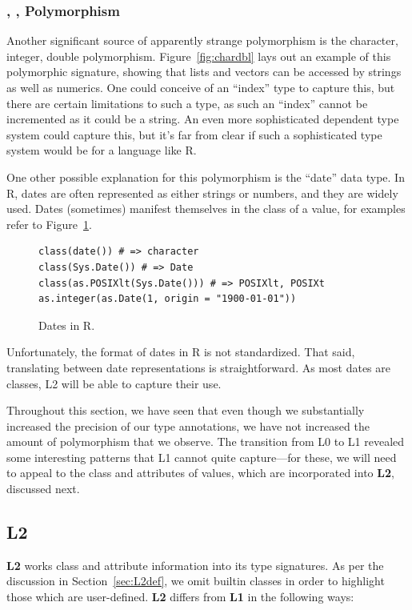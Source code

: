 \documentclass[acmsmall,10pt,review,anonymous]{acmart}\settopmatter{printfolios=true,printccs=false,printacmref=false}
\begin{document}
%
%
\subsubsection{\C, \I, \D Polymorphism}
Another significant source of apparently strange polymorphism is the character, integer, double polymorphism.
Figure~\ref{fig:chardbl} lays out an example of this polymorphic signature, showing that lists and vectors can be accessed by strings as well as numerics.
One could conceive of an ``index'' type to capture this, but there are certain limitations to such a type, as such an ``index'' cannot be incremented as it could be a string.
An even more sophisticated dependent type system could capture this, but it's far from clear if such a sophisticated type system would be for a language like R.

One other possible explanation for this polymorphism is the ``date'' data type.
In R, dates are often represented as either strings or numbers, and they are widely used.
Dates (sometimes) manifest themselves in the class of a value, for examples refer to Figure~\ref{fig:date}.
\begin{figure}[!hb]{\small\begin{lstlisting}[style=R]
class(date()) # => character
class(Sys.Date()) # => Date
class(as.POSIXlt(Sys.Date())) # => POSIXlt, POSIXt
as.integer(as.Date(1, origin = "1900-01-01"))
\end{lstlisting}}\caption{Dates in R.}\label{fig:date}\end{figure}

Unfortunately, the format of dates in R is not standardized.
That said, translating between date representations is straightforward.
As most dates are classes, L2 will be able to capture their use.

Throughout this section, we have seen that even though we substantially increased the precision of our type annotations, we have not increased the amount of polymorphism that we observe.
The transition from L0 to L1 revealed some interesting patterns that L1 cannot quite capture---for these, we will need to appeal to the class and attributes of values, which are incorporated into {\bf L2}, discussed next.

%
%
%
%
\subsection{L2}

{\bf L2} works class and attribute information into its type signatures.
As per the discussion in Section~\ref{sec:L2def}, we omit builtin classes in order to highlight those which are user-defined.
{\bf L2} differs from {\bf L1} in the following ways:
\end{document}
